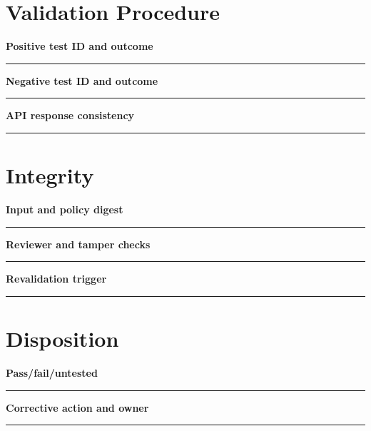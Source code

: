 \documentclass[11pt,letterpaper]{article}
\begin{document}
\section{Validation Procedure}
\noindent\textbf{Positive test ID and outcome}\par
\vspace{1.1em}\noindent\rule{0.96\linewidth}{0.4pt}\par\vspace{0.65em}
\noindent\textbf{Negative test ID and outcome}\par
\vspace{1.1em}\noindent\rule{0.96\linewidth}{0.4pt}\par\vspace{0.65em}
\noindent\textbf{API response consistency}\par
\vspace{1.1em}\noindent\rule{0.96\linewidth}{0.4pt}\par\vspace{0.65em}
\section{Integrity}
\noindent\textbf{Input and policy digest}\par
\vspace{1.1em}\noindent\rule{0.96\linewidth}{0.4pt}\par\vspace{0.65em}
\noindent\textbf{Reviewer and tamper checks}\par
\vspace{1.1em}\noindent\rule{0.96\linewidth}{0.4pt}\par\vspace{0.65em}
\noindent\textbf{Revalidation trigger}\par
\vspace{1.1em}\noindent\rule{0.96\linewidth}{0.4pt}\par\vspace{0.65em}
\section{Disposition}
\noindent\textbf{Pass/fail/untested}\par
\vspace{1.1em}\noindent\rule{0.96\linewidth}{0.4pt}\par\vspace{0.65em}
\noindent\textbf{Corrective action and owner}\par
\vspace{1.1em}\noindent\rule{0.96\linewidth}{0.4pt}\par\vspace{0.65em}
\end{document}
